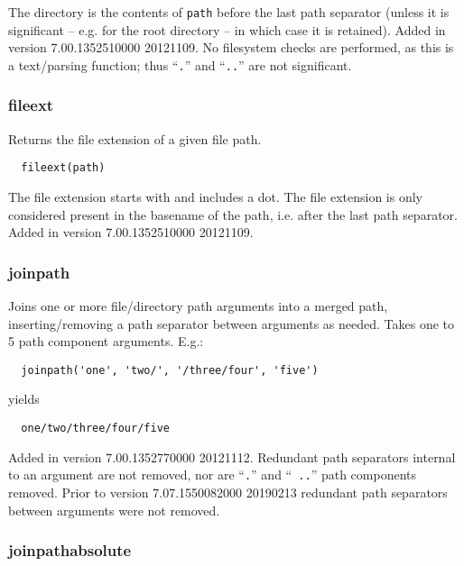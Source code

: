 {The directory is the contents of \verb`path` before the last path separator
(unless it is significant -- e.g. for the root directory -- in which case
it is retained).  Added in version 7.00.1352510000 20121109.
No filesystem checks are performed, as this is a text/parsing function;
thus ``\verb`.`'' and ``\verb`..`'' are not significant.

\subsubsection{fileext}

  Returns the file extension of a given file path.

\begin{verbatim}
  fileext(path)
\end{verbatim}

  The file extension starts with and includes a dot.  The file extension
is only considered present in the basename of the path, i.e. after the
last path separator.  Added in version 7.00.1352510000 20121109.

\subsubsection{joinpath}

Joins one or more file/directory path arguments into a merged path,
inserting/removing a path separator between arguments as needed.
Takes one to 5 path component arguments.  E.g.:

\begin{verbatim}
  joinpath('one', 'two/', '/three/four', 'five')
\end{verbatim}

yields

\begin{verbatim}
  one/two/three/four/five
\end{verbatim}

Added in version 7.00.1352770000 20121112.  Redundant path separators
internal to an argument are not removed, nor are ``{\tt .}'' and ``{\tt
  ..}'' path components removed.  Prior to version 7.07.1550082000
20190213 redundant path separators between arguments were not
removed.

\subsubsection{joinpathabsolute}

}
